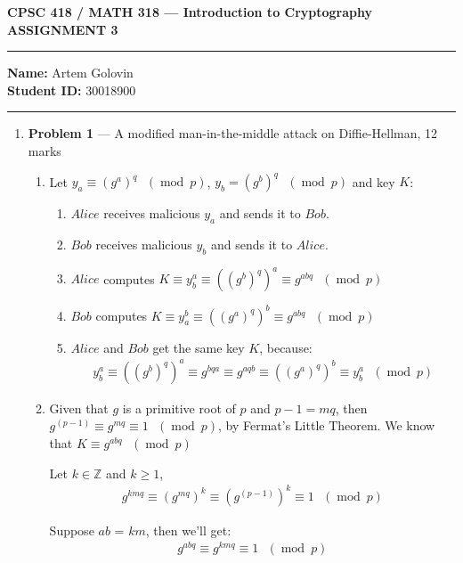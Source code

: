 \documentclass[11pt]{article}
\theoremstyle{definition}
\renewcommand{\pmod}[1]{\mbox{\ $(\ensuremath{\operatorname{mod}}\ {#1})$}}
\newcommand{\Z}{\mathbb{Z}}
\newcommand{\A}{Alice}
\newcommand{\B}{Bob}
\begin{document}
\begin{center}
  \bf \Large CPSC 418 / MATH 318 --- Introduction to Cryptography \\
  ASSIGNMENT 3
\end{center}

\medskip \hrule
  \textbf{Name:} Artem Golovin \\
  \textbf{Student ID:} 30018900
\medskip \hrule


\begin{enumerate} \itemsep 0.3in

\item[] \textbf{Problem 1} --- A modified man-in-the-middle attack on Diffie-Hellman, 12 marks

\begin{enumerate}
  \item
    Let $y_a \equiv (g^a)^q \pmod{p}$, $y_b = (g^b)^q \pmod{p}$ and key $K$:
    \begin{enumerate}
      \item $\A$ receives malicious $y_a$ and sends it to $\B$.
      \item $\B$ receives malicious $y_b$ and sends it to $\A$.
      \item $\A$ computes $K \equiv y_b^a \equiv ((g^b)^q)^a \equiv g^{abq} \pmod{p}$
      \item $\B$ computes $K \equiv y_a^b \equiv ((g^a)^q)^b \equiv g^{abq} \pmod{p}$
      \item $\A$ and $\B$ get the same key $K$, because:
        \begin{align*}
          y_b^a \equiv ((g^b)^q)^a \equiv g^{bqa} \equiv g^{aqb} \equiv ((g^a)^q)^b \equiv y_b^a \pmod{p}
        \end{align*}
    \end{enumerate}
  \item
    Given that $g$ is a primitive root of $p$ and $p - 1 = mq$, then $g^{(p - 1)} \equiv g^{mq} \equiv 1 \pmod{p}$, by Fermat's Little Theorem. We know that $K \equiv g^{abq} \pmod{p}$

    Let $k \in \Z$ and $k \geq 1$,
    \begin{align*}
      g^{kmq} \equiv (g^{mq})^k \equiv (g^{(p - 1)})^k \equiv 1 \pmod{p}
    \end{align*}

    Suppose $ab$ = $km$, then we'll get:
    \begin{align*}
      g^{abq} \equiv g^{kmq} \equiv 1 \pmod {p}
    \end{align*}


\end{enumerate}
\end{enumerate}
\end{document}
